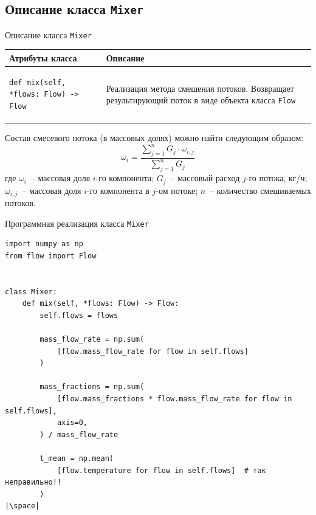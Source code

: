 \documentclass[aspectratio=169, mathserif]{beamer}	%
\begin{document}
\subsection{Описание класса \texttt{Mixer}}
\begin{frame}[fragile]{Описание класса \texttt{Mixer}}
\scriptsize
\begin{table}[h!]
	\centering
	\renewcommand{\arraystretch}{1.2}
	\begin{tabular}{|p{.49\linewidth}|p{.49\linewidth}|}
		\hline
		\textbf{Атрибуты класса} & \textbf{Описание}  \\
		\hline
\begin{minipage}{\linewidth}
\vfill
\begin{verbatim}
def mix(self, *flows: Flow) -> Flow
\end{verbatim}
\vfill
\end{minipage}
		& Реализация метода смешения потоков. Возвращает результирующий поток в виде объекта класса \texttt{Flow}\\
		\hline
	\end{tabular}
\end{table}
\vfill
Состав смесевого потока (в массовых долях) можно найти следующим образом:
\vfill
$$
	\omega _i = \dfrac{\sum \limits_ {j=1} ^{n} G_j \cdot \omega _{i,j}}{\sum \limits_ {j=1} ^{n} G_j}
$$
\vfill
где $\omega _i$~-- массовая доля $i$-го компонента; $G_j$~-- массовый расход $j$-го потока, кг/ч; $\omega _{i,j}$~-- массовая доля $i$-го компонента в $j$-ом потоке; $n$~-- количество смешиваемых потоков.
\vfill
\vfill
\end{frame}

\begin{frame}[fragile]{Программная реализация класса \texttt{Mixer}}
\scriptsize
\begin{verbatim}
import numpy as np
from flow import Flow


class Mixer:
    def mix(self, *flows: Flow) -> Flow:
        self.flows = flows

        mass_flow_rate = np.sum(
            [flow.mass_flow_rate for flow in self.flows]
        )

        mass_fractions = np.sum(
            [flow.mass_fractions * flow.mass_flow_rate for flow in self.flows],
            axis=0,
        ) / mass_flow_rate

        t_mean = np.mean(
            [flow.temperature for flow in self.flows]  # так неправильно!!
        )
|\space|
\end{verbatim}
\vfill
\end{frame}
\end{document}
